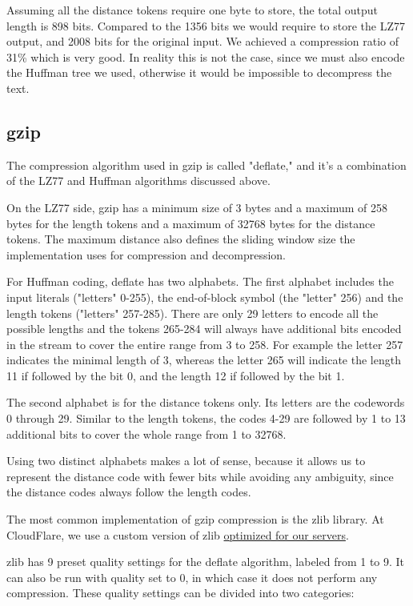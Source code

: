 \documentclass[12pt]{article}
\begin{document}
Assuming all the distance tokens require one byte to store, the total
output length is 898 bits. Compared to the 1356 bits we would require to
store the LZ77 output, and 2008 bits for the original input. We achieved
a compression ratio of 31\% which is very good. In reality this is not
the case, since we must also encode the Huffman tree we used, otherwise
it would be impossible to decompress the text.


\subsection{gzip}

The compression algorithm used in gzip is called "deflate," and it’s a
combination of the LZ77 and Huffman algorithms discussed above.

On the LZ77 side, gzip has a minimum size of 3 bytes and a maximum of
258 bytes for the length tokens and a maximum of 32768 bytes for the
distance tokens. The maximum distance also defines the sliding window
size the implementation uses for compression and decompression.

For Huffman coding, deflate has two alphabets. The first alphabet
includes the input literals ("letters" 0-255), the end-of-block symbol
(the "letter" 256) and the length tokens ("letters" 257-285). There are
only 29 letters to encode all the possible lengths and the tokens
265-284 will always have additional bits encoded in the stream to cover
the entire range from 3 to 258. For example the letter 257 indicates the
minimal length of 3, whereas the letter 265 will indicate the length 11
if followed by the bit 0, and the length 12 if followed by the bit 1.

The second alphabet is for the distance tokens only. Its letters are the
codewords 0 through 29. Similar to the length tokens, the codes 4-29 are
followed by 1 to 13 additional bits to cover the whole range from 1 to
32768.

Using two distinct alphabets makes a lot of sense, because it allows us
to represent the distance code with fewer bits while avoiding any
ambiguity, since the distance codes always follow the length codes.

The most common implementation of gzip compression is the zlib library. At
CloudFlare, we use a custom version of zlib
\href{https://blog.cloudflare.com/cloudflare-fights-cancer/}{optimized for our
servers}.

zlib has 9 preset quality settings for the deflate algorithm, labeled
from 1 to 9. It can also be run with quality set to 0, in which case it
does not perform any compression. These quality settings can be divided
into two categories:
\end{document}
